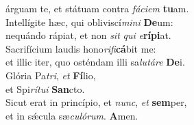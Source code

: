 \evenverse árguam te, et státuam contra \textit{fá}\textit{ci}\textit{em} \textbf{tu}am.\\
\oddverse Intellígite hæc, qui obliviscí\textit{mi}\textit{ni} \textbf{De}um:~\*\\
\oddverse nequándo rápiat, et non \textit{sit} \textit{qui} \textit{e}\textbf{rí}\textbf{pi}at.\\
\evenverse Sacrifícium laudis hono\textit{ri}\textit{fi}\textbf{cá}bit me:~\*\\
\evenverse et illic iter, quo osténdam illi sa\textit{lu}\textit{tá}\textit{re} \textbf{De}i.\\
\oddverse Glória Pa\textit{tri}, \textit{et} \textbf{Fí}lio,~\*\\
\oddverse et Spi\textit{rí}\textit{tu}\textit{i} \textbf{San}cto.\\
\evenverse Sicut erat in princípio, et \textit{nunc}, \textit{et} \textbf{sem}per,~\*\\
\evenverse et in sǽcula sæ\textit{cu}\textit{ló}\textit{rum}. \textbf{A}men.\\
